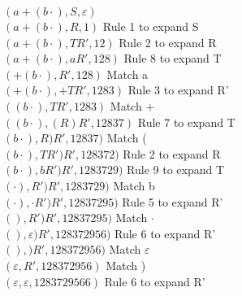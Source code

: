 \noindent $(a + (b\cdot), S, \varepsilon)$ \\
$(a + (b\cdot), R, 1)$ Rule 1 to expand S \\
$(a + (b\cdot), TR', 12)$ Rule 2 to expand R \\
$(a + (b\cdot), aR', 128)$ Rule 8 to expand T \\
$(+ (b\cdot), R', 128)$ Match a \\
$(+ (b\cdot), +TR', 1283)$ Rule 3 to expand R' \\
$( (b\cdot), TR', 1283)$ Match + \\
$( (b\cdot), (R)R', 12837)$ Rule 7 to expand T \\
$( b\cdot), R)R', 12837)$ Match ( \\
$( b\cdot), TR')R', 128372)$ Rule 2 to expand R \\
$( b\cdot), bR')R', 1283729)$ Rule 9 to expand T \\
$( \cdot), R')R', 1283729)$ Match b \\
$( \cdot), \cdot R')R', 12837295)$ Rule 5 to expand R' \\
$( ), R')R', 12837295)$ Match $\cdot$ \\
$( ), \varepsilon)R', 128372956)$ Rule 6 to expand R' \\
$( ), )R', 128372956)$ Match $\varepsilon$ \\
$(\varepsilon, R', 128372956)$ Match ) \\
$(\varepsilon, \varepsilon, 1283729566)$ Rule 6 to expand R' \\